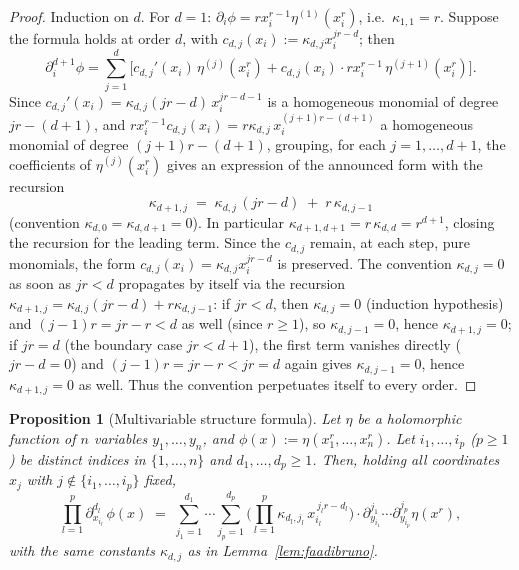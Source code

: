 \documentclass[10pt,a4paper]{amsart}
\newtheorem{proposition}[theorem]{Proposition}
\begin{document}
\begin{proof}
Induction on $d$. For $d=1$: $\partial_i\phi=rx_i^{r-1}\eta^{(1)}(x_i^r)$, i.e.\ $\kappa_{1,1}=r$. Suppose the formula holds at order $d$, with $c_{d,j}(x_i):=\kappa_{d,j}x_i^{jr-d}$; then
\[
\partial_i^{d+1}\phi = \sum_{j=1}^d \Big[c_{d,j}'(x_i)\,\eta^{(j)}(x_i^r) + c_{d,j}(x_i)\cdot rx_i^{r-1}\,\eta^{(j+1)}(x_i^r)\Big].
\]
Since $c_{d,j}'(x_i)=\kappa_{d,j}(jr-d)\,x_i^{jr-d-1}$ is a homogeneous monomial of degree $jr-(d+1)$, and $rx_i^{r-1}c_{d,j}(x_i)=r\kappa_{d,j}\,x_i^{(j+1)r-(d+1)}$ a homogeneous monomial of degree $(j+1)r-(d+1)$, grouping, for each $j=1,\dots,d+1$, the coefficients of $\eta^{(j)}(x_i^r)$ gives an expression of the announced form with the recursion
\[
\kappa_{d+1,j} \;=\; \kappa_{d,j}\,(jr-d) \;+\; r\,\kappa_{d,j-1}
\]
(convention $\kappa_{d,0}=\kappa_{d,d+1}=0$). In particular $\kappa_{d+1,d+1}=r\,\kappa_{d,d}=r^{d+1}$, closing the recursion for the leading term. Since the $c_{d,j}$ remain, at each step, pure monomials, the form $c_{d,j}(x_i)=\kappa_{d,j}x_i^{jr-d}$ is preserved. The convention $\kappa_{d,j}=0$ as soon as $jr<d$ propagates by itself via the recursion $\kappa_{d+1,j}=\kappa_{d,j}(jr-d)+r\kappa_{d,j-1}$: if $jr<d$, then $\kappa_{d,j}=0$ (induction hypothesis) and $(j-1)r=jr-r<d$ as well (since $r\ge1$), so $\kappa_{d,j-1}=0$, hence $\kappa_{d+1,j}=0$; if $jr=d$ (the boundary case $jr<d+1$), the first term vanishes directly ($jr-d=0$) and $(j-1)r=jr-r<jr=d$ again gives $\kappa_{d,j-1}=0$, hence $\kappa_{d+1,j}=0$ as well. Thus the convention perpetuates itself to every order.
\end{proof}

\begin{proposition}[Multivariable structure formula]\label{prop:faadibruno-mixed}
Let $\eta$ be a holomorphic function of $n$ variables $y_1,\dots,y_n$, and $\phi(x):=\eta(x_1^r,\dots,x_n^r)$. Let $i_1,\dots,i_p$ ($p\ge1$) be distinct indices in $\{1,\dots,n\}$ and $d_1,\dots,d_p\ge1$. Then, holding all coordinates $x_j$ with $j\notin\{i_1,\dots,i_p\}$ fixed,
\[
\prod_{l=1}^p \partial_{x_{i_l}}^{d_l}\,\phi(x) \;=\; \sum_{j_1=1}^{d_1}\cdots\sum_{j_p=1}^{d_p} \Big(\prod_{l=1}^p \kappa_{d_l,j_l}\,x_{i_l}^{\,j_lr-d_l}\Big)\cdot \partial_{y_{i_1}}^{j_1}\cdots\partial_{y_{i_p}}^{j_p}\eta(x^r),
\]
with the same constants $\kappa_{d,j}$ as in Lemma~\ref{lem:faadibruno}.
\end{proposition}
\end{document}
